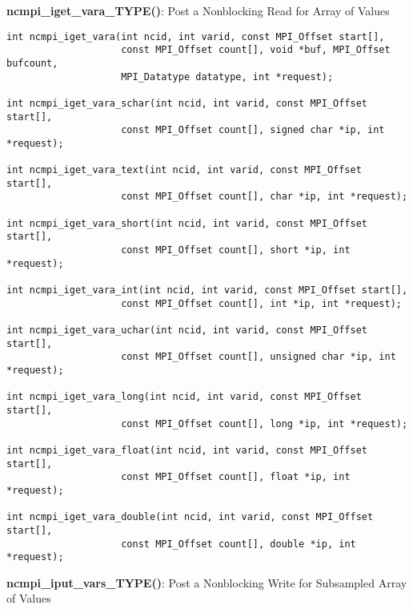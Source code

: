{\bf ncmpi\_iget\_vara\_TYPE()}: Post a Nonblocking Read for Array of Values

\begin{verbatim}
int ncmpi_iget_vara(int ncid, int varid, const MPI_Offset start[],
                    const MPI_Offset count[], void *buf, MPI_Offset bufcount,
                    MPI_Datatype datatype, int *request);

int ncmpi_iget_vara_schar(int ncid, int varid, const MPI_Offset start[],
                    const MPI_Offset count[], signed char *ip, int *request);

int ncmpi_iget_vara_text(int ncid, int varid, const MPI_Offset start[],
                    const MPI_Offset count[], char *ip, int *request);

int ncmpi_iget_vara_short(int ncid, int varid, const MPI_Offset start[],
                    const MPI_Offset count[], short *ip, int *request);

int ncmpi_iget_vara_int(int ncid, int varid, const MPI_Offset start[],
                    const MPI_Offset count[], int *ip, int *request);

int ncmpi_iget_vara_uchar(int ncid, int varid, const MPI_Offset start[],
                    const MPI_Offset count[], unsigned char *ip, int *request);

int ncmpi_iget_vara_long(int ncid, int varid, const MPI_Offset start[],
                    const MPI_Offset count[], long *ip, int *request);

int ncmpi_iget_vara_float(int ncid, int varid, const MPI_Offset start[],
                    const MPI_Offset count[], float *ip, int *request);

int ncmpi_iget_vara_double(int ncid, int varid, const MPI_Offset start[],
                    const MPI_Offset count[], double *ip, int *request);
\end{verbatim}


{\bf ncmpi\_iput\_vars\_TYPE()}: Post a Nonblocking Write for Subsampled Array of Values

